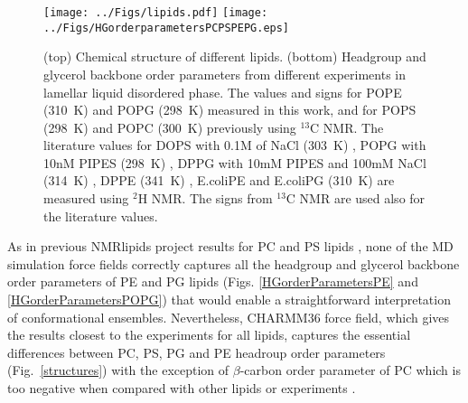 \documentclass[aps,prl,superscriptaddress,twocolumn]{revtex4}
\begin{document}
\begin{figure}[]
  \centering
  \texttt{[image: ../Figs/lipids.pdf]}
  \texttt{[image: ../Figs/HGorderparametersPCPSPEPG.eps]}
  \caption{\label{HGorderParameters}
    (top) Chemical structure of different lipids.
    (bottom) Headgroup and glycerol backbone order parameters
    from different experiments in lamellar liquid disordered phase.
    The values and signs for POPE (310~K) and POPG (298~K)
    measured in this work, and for POPS (298~K) \cite{antila19} and POPC (300~K) \cite{ferreira13,ferreira16}
    previously using $^{13}$C NMR. The literature values for
    DOPS with 0.1M of NaCl (303~K) \cite{browning80},
    POPG with 10nM PIPES (298~K) \cite{borle85},
    DPPG with 10mM PIPES and 100mM NaCl (314~K) \cite{wohlgemuth80}, 
    DPPE (341~K) \cite{seelig76},
    E.coliPE and E.coliPG (310~K) \cite{gally81}
    are measured using $^2$H NMR. The signs from $^{13}$C NMR are used also for the literature values.
  }
\end{figure}

As in previous NMRlipids project results for PC and PS lipids \cite{botan15,antila19},
none of the MD simulation force fields correctly captures all the
headgroup and glycerol backbone order parameters of PE and PG lipids
(Figs. \ref{HGorderParametersPE} and \ref{HGorderParametersPOPG})
that would enable a straightforward interpretation of conformational ensembles.
Nevertheless, CHARMM36 force field, which gives the results closest to the experiments for all lipids,
captures the essential differences between
PC, PS, PG and PE headroup order parameters  (Fig.~\ref{structures}) with the exception of $\beta$-carbon order parameter of PC
which is too negative when compared with other lipids or experiments \cite{botan15}.
\end{document}
